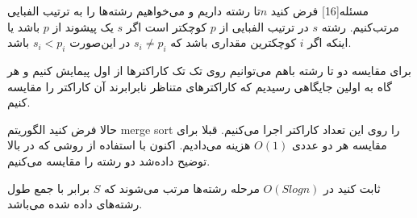 ‌مسئله[16]
فرض کنید $n$تا رشته داریم 
و می‌خواهیم رشته‌ها را به ترتیب الفبایی مرتب‌کنیم.
رشته $s$
در ترتیب الفبایی از 
$p$
کوچکتر است اگر 
$s$
یک پیشوند از 
$p$
باشد یا اینکه اگر 
$i$
کوچکترین مقداری باشد که
$s_i \neq p_i$
در این‌صورت
$s_i < p_i$
باشد.

برای مقایسه دو تا رشته باهم می‌توانیم روی تک تک کاراکترها از اول پیمایش کنیم و هر گاه به اولین جایگاهی رسیدیم که کاراکترهای متناظر نابرابرند آن کاراکتر را مقایسه کنیم.

حالا فرض کنید الگوریتم 
merge sort
را روی این تعداد کاراکتر اجرا می‌کنیم.
قبلا برای مقایسه هر دو عددی 
$O(1)$
هزینه می‌دادیم. اکنون با استفاده از روشی که در بالا توضیح داده‌شد دو رشته را مقایسه می‌کنیم.

ثابت کنید در 
$O(Slogn)$
مرحله رشته‌ها مرتب می‌شوند که $S$
برابر با جمع طول رشته‌های داده شده می‌باشد.














